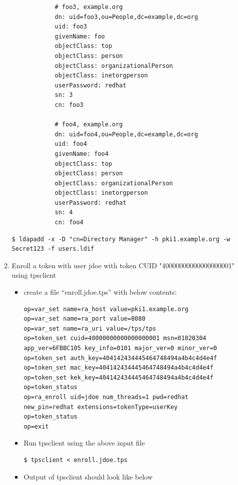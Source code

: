 \documentclass[12pt]{report}
\begin{document}
\begin{enumerate}[label*=\arabic*.]
\begin{enumerate}[label*=\arabic*.]
\begin{lstlisting}
            # foo3, example.org
            dn: uid=foo3,ou=People,dc=example,dc=org
            uid: foo3
            givenName: foo
            objectClass: top
            objectClass: person
            objectClass: organizationalPerson
            objectClass: inetorgperson
            userPassword: redhat
            sn: 3
            cn: foo3

            # foo4, example.org
            dn: uid=foo4,ou=People,dc=example,dc=org
            uid: foo4
            givenName: foo4
            objectClass: top
            objectClass: person
            objectClass: organizationalPerson
            objectClass: inetorgperson
            userPassword: redhat
            sn: 4
            cn: foo4
            \end{lstlisting}
            \begin{lstlisting}[style=bashInputStyle]
$ ldapadd -x -D "cn=Directory Manager" -h pki1.example.org -w Secret123 -f users.ldif
            \end{lstlisting}
        \item \label{token_ex2} Enroll a token with user jdoe with token CUID "40000000000000000001" using tpsclient
                \begin{itemize}
                    \item create a file ``enroll.jdoe.tps'' with below contents:
                        \begin{lstlisting}[style=configFile]
op=var_set name=ra_host value=pki1.example.org
op=var_set name=ra_port value=8080
op=var_set name=ra_uri value=/tps/tps
op=token_set cuid=40000000000000000001 msn=01020304 app_ver=6FBBC105 key_info=0101 major_ver=0 minor_ver=0
op=token_set auth_key=404142434445464748494a4b4c4d4e4f
op=token_set mac_key=404142434445464748494a4b4c4d4e4f
op=token_set kek_key=404142434445464748494a4b4c4d4e4f
op=token_status
op=ra_enroll uid=jdoe num_threads=1 pwd=redhat new_pin=redhat extensions=tokenType=userKey
op=token_status
op=exit
                        \end{lstlisting}
                    \item \label{token_ex3} Run tpsclient using the above input file 
                        \begin{lstlisting}[style=bashInputStyle]
$ tpsclient < enroll.jdoe.tps               
                        \end{lstlisting}
                    \item \label{token_ex4} Output of tpsclient should look like below

\end{itemize}
\end{enumerate}
\end{enumerate}
\end{document}
